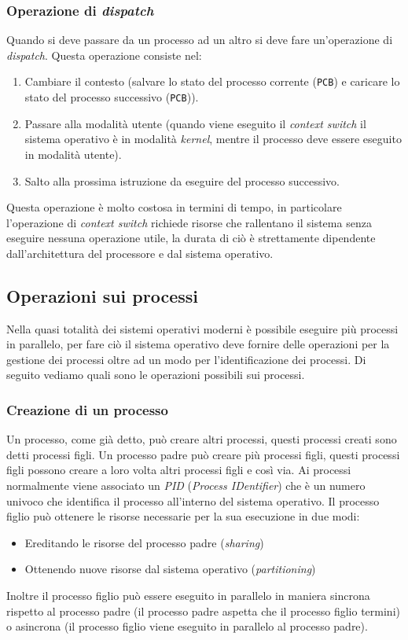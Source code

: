         \subsubsection{Operazione di \textit{dispatch}}
            Quando si deve passare da un processo ad un altro si deve fare un'operazione di \textit{dispatch}. Questa operazione consiste nel:
            \begin{enumerate}
                \item Cambiare il contesto (salvare lo stato del processo corrente (\texttt{PCB}) e caricare lo stato del processo successivo (\texttt{PCB})).
                \item Passare alla modalità utente (quando viene eseguito il \textit{context switch} il sistema operativo è in modalità \textit{kernel}, mentre il processo deve essere eseguito in modalità utente).
                \item Salto alla prossima istruzione da eseguire del processo successivo.
            \end{enumerate}
            Questa operazione è molto costosa in termini di tempo, in particolare l'operazione di \textit{context switch} richiede risorse che rallentano il sistema senza eseguire nessuna operazione utile, la durata di ciò è strettamente dipendente dall'architettura del processore e dal sistema operativo.
    \subsection{Operazioni sui processi}
        Nella quasi totalità dei sistemi operativi moderni è possibile eseguire più processi in parallelo, per fare ciò il sistema operativo deve fornire delle operazioni per la gestione dei processi oltre ad un modo per l'identificazione dei processi. Di seguito vediamo quali sono le operazioni possibili sui processi.
        \subsubsection{Creazione di un processo}
            Un processo, come già detto, può creare altri processi, questi processi creati sono detti processi figli. Un processo padre può creare più processi figli, questi processi figli possono creare a loro volta altri processi figli e così via. Ai processi normalmente viene associato un \textit{PID} (\textit{Process IDentifier}) che è un numero univoco che identifica il processo all'interno del sistema operativo. \newline
            Il processo figlio può ottenere le risorse necessarie per la sua esecuzione in due modi:
            \begin{itemize}
                \item Ereditando le risorse del processo padre (\textit{sharing})
                \item Ottenendo nuove risorse dal sistema operativo (\textit{partitioning})
            \end{itemize}
            Inoltre il processo figlio può essere eseguito in parallelo in maniera sincrona rispetto al processo padre (il processo padre aspetta che il processo figlio termini) o asincrona (il processo figlio viene eseguito in parallelo al processo padre).

